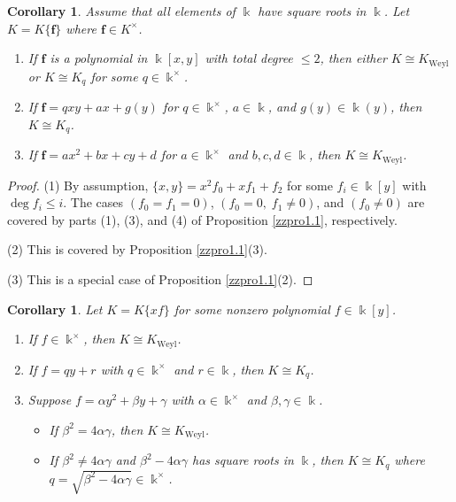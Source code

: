 \documentclass[12pt]{amsart}
\theoremstyle{plain}
\newtheorem{corollary}[theorem]{Corollary}
\numberwithin{theorem}{section}
\numberwithin{equation}{theorem}
\theoremstyle{definition}
\newcommand \bff {{\mathbf{f}}}
\DeclareMathOperator{\Weyl}{Weyl}
\newcommand \Kweyl {K_{\Weyl}}
\newcommand \kx {\Bbbk^\times}
\begin{document}
\begin{corollary}  
\label{zzcor1.2}
\cite[Proposition, \S1.2.1, p.12]{Dumas}
Assume that all elements of $\Bbbk$ have 
square roots in $\Bbbk$. Let $K = K\{\bff\}$ 
where $\bff\in K^{\times}$.
\begin{enumerate}
\item[(1)]
If $\bff$ is a polynomial in $\Bbbk[x,y]$ 
with total degree $\le 2$, then either 
$K \cong \Kweyl$ or $K \cong K_q$ for 
some $q \in \kx$.
\item[(2)]
If $\bff= qxy+ a x+ g(y)$ for 
$q\in \Bbbk^{\times}$, $a\in \Bbbk$, 
and $g(y)\in \Bbbk(y)$, then 
$K\cong K_q$.
\item[(3)]
If $\bff=a x^2 +bx + cy+d$ for 
$a \in \kx$ and $b,c,d \in \Bbbk$, then 
$K\cong \Kweyl$.
\end{enumerate}
\end{corollary}

\begin{proof}
(1) By assumption, $\{x,y\} = x^2 f_0 
+ x f_1 + f_2$ for some $f_i \in \Bbbk[y]$ 
with $\deg f_i \le i$. The cases $(f_0=f_1=0)$, $(f_0=0,\; f_1 \ne 0)$, and $(f_0 \ne 0)$ 
are covered by parts (1), (3), and (4) 
of Proposition \ref{zzpro1.1}, respectively.

(2) This is covered by Proposition 
\ref{zzpro1.1}(3).

(3) This is a special case of  
Proposition \ref{zzpro1.1}(2). 
\end{proof}

\begin{corollary}  
\label{zzcor1.3}
Let $K = K\{xf\}$ for some nonzero 
polynomial $f \in \Bbbk[y]$.
\begin{enumerate}
\item[(1)] 
If $f \in \kx$, then $K \cong \Kweyl$.
\item[(2)] 
If $f = qy+r$ with $q \in \kx$ and 
$r \in \Bbbk$, then $K \cong K_q$.
\item[(3)] 
Suppose $f = \alpha y^2 + \beta y + \gamma$ 
with $\alpha \in \kx$ and $\beta,\gamma 
\in \Bbbk$. 
\begin{itemize}
\item 
If $\beta^2 = 4 \alpha \gamma$, then 
$K \cong \Kweyl$.
\item 
If $\beta^2 \ne 4 \alpha \gamma$ and 
$\beta^2 - 4 \alpha \gamma$ has square 
roots in $\Bbbk$, then $K \cong K_q$ 
where $q = \sqrt{\beta^2 - 4 \alpha \gamma} 
\in \kx$.
\end{itemize}
\end{enumerate}
\end{corollary}
\end{document}
